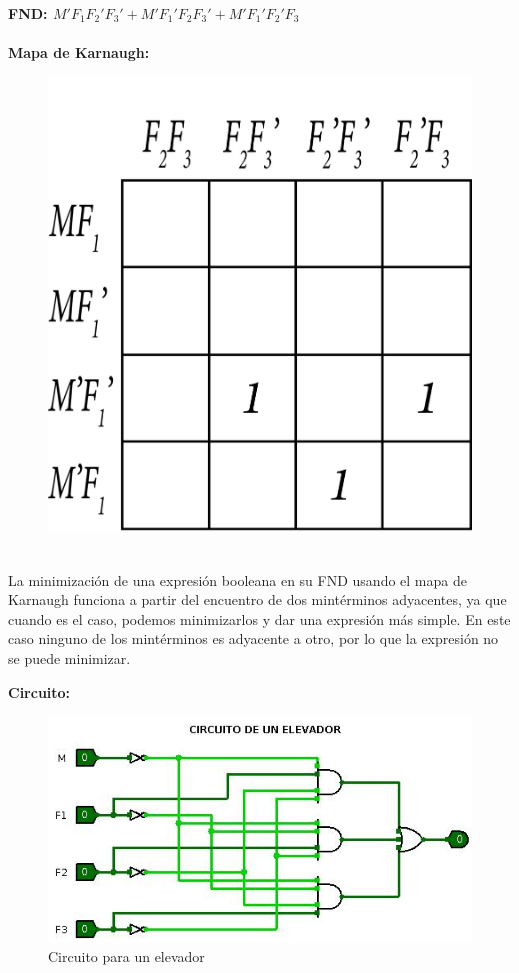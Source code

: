 \documentclass[12pt]{article} %
\begin{document}
\begin{enumerate}
        \textbf{FND: $M'F_1F_2'F_3' + M'F_1'F_2F_3' + M'F_1'F_2'F_3$}\\
        \\
        \textbf{Mapa de Karnaugh:}
            \begin{figure}[h!]
                \centering 
                \includegraphics[scale=0.15]{Mapa1.jpeg}
            \end{figure}
        \\

        La minimización de una expresión booleana en su FND usando el 
        mapa de Karnaugh funciona a partir del encuentro de dos 
        mintérminos adyacentes, ya que cuando es el caso, podemos 
        minimizarlos y dar una expresión más simple. En este caso 
        ninguno de los mintérminos es adyacente a otro, por lo que la 
        expresión no se puede minimizar.
        
        \newpage 
        \textbf{Circuito:}
            \begin{figure}[h!]
                \centering 
                \includegraphics[scale=0.7]{ejercicio2.jpg}
                \caption{Circuito para un elevador}
            \end{figure}
        

\end{enumerate}
\end{document}
